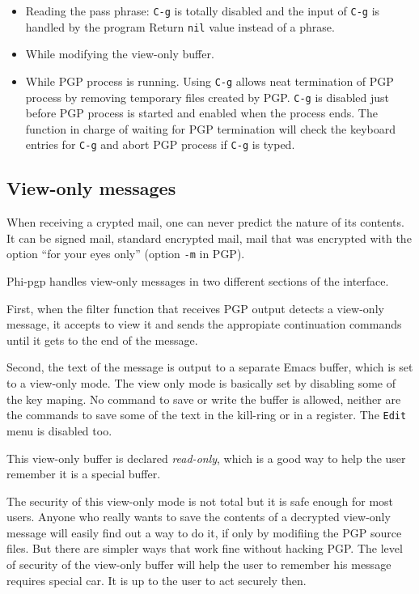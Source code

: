 \begin{itemize}
 \item Reading the pass phrase:   {\tt C-g} is totally disabled and
the input of  {\tt C-g} is  handled by the  program Return {\tt  nil}
value instead of a phrase.

 \item While modifying the view-only buffer.

 \item  While PGP  process is  running.  Using {\tt  C-g}  allows neat
termination of PGP  process by  removing  temporary files created   by
PGP. {\tt  C-g}  is disabled  just  before PGP process is  started and
enabled when  the process ends. The function  in charge  of waiting for
PGP termination will  check the  keyboard entries  for  {\tt C-g}  and
abort PGP process if {\tt C-g} is typed.
\end{itemize}

\subsection{ View-only messages}

When receiving a crypted mail, one can never predict the nature of its
contents. It  can be signed mail,  standard  encrypted mail, mail that
was encrypted with the option ``for your eyes  only'' (option {\tt -m}
in PGP).

Phi-pgp handles  view-only messages in two  different sections  of the
interface.

First,  when the filter  function  that receives PGP  output detects a
view-only  message, it  accepts  to view it  and  sends the appropiate
continuation commands until it gets to the end of the message.

Second, the text of the message is output  to a separate Emacs buffer,
which is set to a view-only mode.  The view only mode is basically set
by disabling some of the key  maping. No command  to save or write the
buffer is allowed,  neither are the commands to  save some of the text
in the  kill-ring or in a  register. The {\tt  Edit} menu  is disabled
too.

This view-only buffer is declared {\it read-only}, which is a good way
to help the user remember it is a special buffer.

The security of this view-only mode is not total but it is safe enough
for most users.   Anyone who really wants  to save  the contents of  a
decrypted  view-only message will easily find  out a way  to do it, if
only by  modifiing the  PGP source files.  But  there are simpler ways
that work   fine without hacking  PGP.   The level  of security of the
view-only buffer will  help the user to  remember his message requires
special car. It is up to the user to act securely then.

